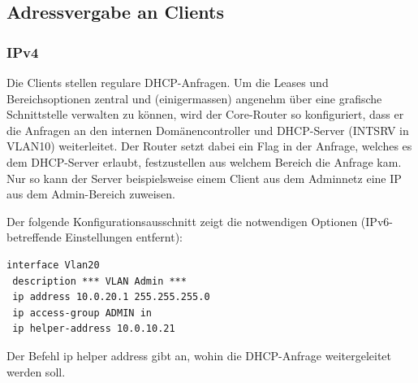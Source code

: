 \documentclass[11pt,a4paper,parskip=half]{scrartcl}
\begin{document}
\subsection{Adressvergabe an Clients}
\subsubsection{IPv4}
Die Clients stellen regulare DHCP-Anfragen. Um die Leases und Bereichsoptionen zentral und (einigermassen) angenehm über eine grafische Schnittstelle verwalten zu können, wird der Core-Router so konfiguriert, dass er die Anfragen an den internen Domänencontroller und DHCP-Server (INTSRV in VLAN10) weiterleitet. Der Router setzt dabei ein Flag in der Anfrage, welches es dem DHCP-Server erlaubt, festzustellen aus welchem Bereich die Anfrage kam. Nur so kann der Server beispielsweise einem Client aus dem Adminnetz eine IP aus dem Admin-Bereich zuweisen.

Der folgende Konfigurationsausschnitt zeigt die notwendigen Optionen (IPv6-betreffende Einstellungen entfernt):
\begin{lstlisting}
interface Vlan20
 description *** VLAN Admin ***
 ip address 10.0.20.1 255.255.255.0
 ip access-group ADMIN in
 ip helper-address 10.0.10.21
\end{lstlisting} 

Der Befehl \glqq{}ip helper address\grqq{} gibt an, wohin die DHCP-Anfrage weitergeleitet werden soll.
\end{document}
